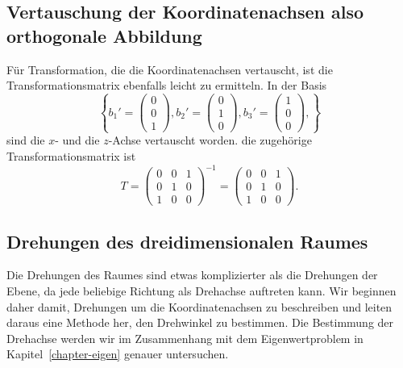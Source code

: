 %
%
\subsection{Vertauschung der Koordinatenachsen also orthogonale Abbildung}
Für Transformation, die die Koordinatenachsen vertauscht, ist
die Transformationsmatrix ebenfalls leicht zu ermitteln.
In der Basis
\[
\left\{
b_1'=\begin{pmatrix}0\\0\\1\end{pmatrix},
b_2'=\begin{pmatrix}0\\1\\0\end{pmatrix},
b_3'=\begin{pmatrix}1\\0\\0\end{pmatrix},
\right\}
\]
sind die $x$- und die $z$-Achse vertauscht worden.
die zugehörige Transformationsmatrix ist
\begin{equation}
T=\begin{pmatrix}
0&0&1\\
0&1&0\\
1&0&0
\end{pmatrix}^{-1}
=
\begin{pmatrix}
0&0&1\\
0&1&0\\
1&0&0
\end{pmatrix}.
\label{transformation-vertauschung}
\end{equation}

%
%
\subsection{Drehungen des dreidimensionalen Raumes}
Die Drehungen des Raumes sind etwas komplizierter als die Drehungen der
Ebene, da jede beliebige Richtung als Drehachse auftreten kann.
Wir beginnen daher damit, Drehungen um die Koordinatenachsen zu beschreiben
und leiten daraus eine Methode her, den Drehwinkel zu bestimmen.
Die Bestimmung der Drehachse werden wir im Zusammenhang mit dem
Eigenwertproblem in Kapitel~\ref{chapter-eigen} genauer untersuchen.

